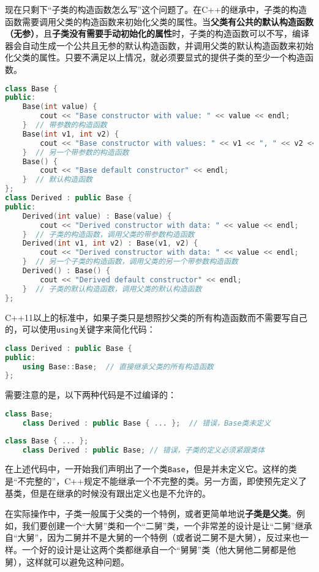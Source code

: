 \documentclass[../main.tex]{subfiles}
\begin{document}
现在只剩下“子类的构造函数怎么写”这个问题了。在C++的继承中，子类的构造函数需要调用父类的构造函数来初始化父类的属性。当\textbf{父类有公共的默认构造函数（无参）}，且\textbf{子类没有需要手动初始化的属性}时，子类的构造函数可以不写，编译器会自动生成一个公共且无参的默认构造函数，并调用父类的默认构造函数来初始化父类的属性。只要不满足以上情况，就必须要显式的提供子类的至少一个构造函数。
\begin{lstlisting}[language=C++]
class Base {
public:
    Base(int value) {
        cout << "Base constructor with value: " << value << endl; 
    }  // 带参数的构造函数
    Base(int v1, int v2) { 
        cout << "Base constructor with values: " << v1 << ", " << v2 << endl; 
    }  // 另一个带参数的构造函数
    Base() { 
        cout << "Base default constructor" << endl; 
    }  // 默认构造函数
};
class Derived : public Base {
public:
    Derived(int value) : Base(value) {
        cout << "Derived constructor with data: " << value << endl;
    }  // 子类的构造函数，调用父类的带参数构造函数
    Derived(int v1, int v2) : Base(v1, v2) {
        cout << "Derived constructor with data: " << value << endl;
    }  // 另一个子类的构造函数，调用父类的另一个带参数构造函数
    Derived() : Base() {
        cout << "Derived default constructor" << endl;
    }  // 子类的默认构造函数，调用父类的默认构造函数
};
\end{lstlisting}

C++11以上的标准中，如果子类只是想照抄父类的所有构造函数而不需要写自己的，可以使用\texttt{using}关键字来简化代码：
\begin{lstlisting}[language=C++]
class Derived : public Base {
public:
    using Base::Base;  // 直接继承父类的所有构造函数
};
\end{lstlisting}

需要注意的是，以下两种代码是不过编译的：
\begin{lstlisting}[language=C++]
    class Base;
    class Derived : public Base { ... };  // 错误，Base类未定义
\end{lstlisting}
\begin{lstlisting}[language=C++]
    class Base { ... };
    class Derived : public Base; // 错误，子类的定义必须紧跟类体
\end{lstlisting}
在上述代码中，一开始我们声明出了一个类\texttt{Base}，但是并未定义它。这样的类是“不完整的”，C++规定不能继承一个不完整的类。另一方面，即使预先定义了基类，但是在继承的时候没有跟出定义也是不允许的。

在实际操作中，子类一般属于父类的一个特例，或者更简单地说\textbf{子类是父类}。例如，我们要创建一个“大舅”类和一个“二舅”类，一个非常差的设计是让“二舅”继承自“大舅”，因为二舅并不是大舅的一个特例（或者说二舅不是大舅），反过来也一样。一个好的设计是让这两个类都继承自一个“舅舅”类（他大舅他二舅都是他舅），这样就可以避免这种问题。
\end{document}
